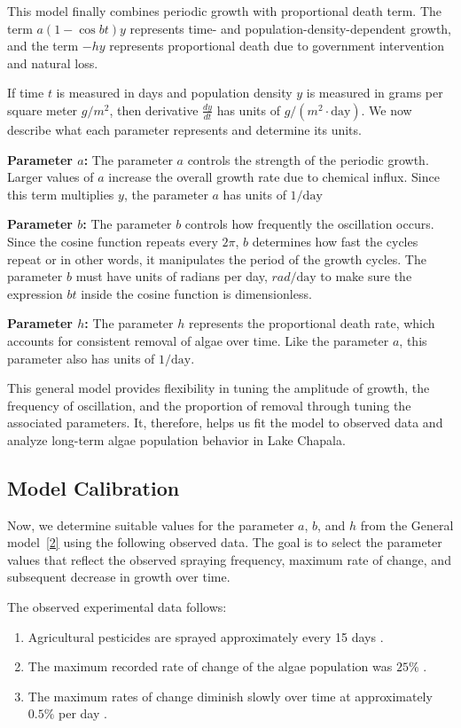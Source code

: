 \documentclass[11pt]{article}
\begin{document}
This model finally combines periodic growth with proportional death term. The term $a(1-\cos{bt})y$ represents time- and population-density-dependent growth, and the term $-hy$ represents proportional death due to government intervention and natural loss.

If time $t$ is measured in days and population density $y$ is measured in grams per square meter $g/m^2$, then derivative $\frac{dy}{dt}$ has units of $g/(m^2\cdot \text{day})$. We now describe what each parameter represents and determine its units.

\textbf{Parameter $a$:} The parameter $a$ controls the strength of the periodic growth. Larger values of $a$ increase the overall growth rate due to chemical influx. Since this term multiplies $y$, the parameter $a$ has units of $1/\text{day}$

\textbf{Parameter $b$:} The parameter $b$ controls how frequently the oscillation occurs. Since the cosine function repeats every $2\pi$, $b$ determines how fast the cycles repeat or in other words, it manipulates the period of the growth cycles. The parameter $b$ must have units of radians per day, $rad/\text{day}$ to make sure the expression $bt$ inside the cosine function is dimensionless.

\textbf{Parameter $h$:} The parameter $h$ represents the proportional death rate, which accounts for consistent removal of algae over time. Like the parameter $a$, this parameter also has units of $1/\text{day}$.

This general model provides flexibility in tuning the amplitude of growth, the frequency of oscillation, and the proportion of removal through tuning the associated parameters. It, therefore, helps us fit the model to observed data and analyze long-term algae population behavior in Lake Chapala.

\subsection{Model Calibration}

Now, we determine suitable values for the parameter $a$, $b$, and $h$ from the General model~\ref{2} using the following observed data. The goal is to select the parameter values that reflect the observed spraying frequency, maximum rate of change, and subsequent decrease in growth over time.

The observed experimental data follows:
\begin{enumerate}
    \item Agricultural pesticides are sprayed approximately every 15 days \cite{harwood-algae}.
    \item The maximum recorded rate of change of the algae population was $25\%$ \cite{harwood-algae}.
    \item The maximum rates of change diminish slowly over time at approximately $0.5\%$ per day \cite{harwood-algae}.
\end{enumerate}
\end{document}
